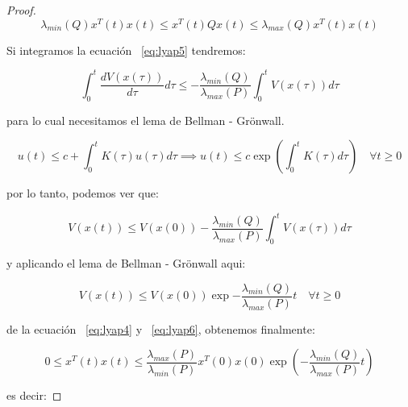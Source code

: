 \begin{proof}
            \begin{equation*}
                \lambda_{min}(Q) x^T(t) x(t) \le x^T(t) Q x(t) \le \lambda_{max}(Q) x^T(t) x(t)
            \end{equation*}

            Si integramos la ecuación ~\ref{eq:lyap5} tendremos:

            \begin{equation*}
                \int_{0}^{t}\frac{dV(x(\tau))}{d\tau} d\tau \le - \frac{\lambda_{min}(Q)}{\lambda_{max}(P)} \int_{0}^{t} V(x(\tau)) d\tau
            \end{equation*}

            para lo cual necesitamos el lema de Bellman - Grönwall.

            \begin{nota}
                \begin{equation*}
                    u(t) \le c + \int_0^t K(\tau) u(\tau) d\tau \implies u(t) \le c \exp{\left( \int_0^t K(\tau) d\tau \right)} \quad \forall t \ge 0
                \end{equation*}
            \end{nota}

            por lo tanto, podemos ver que:

            \begin{equation}
                V(x(t)) \le V(x(0)) - \frac{\lambda_{min}(Q)}{\lambda_{max}(P)} \int_0^t V(x(\tau)) d\tau
            \end{equation}

            y aplicando el lema de Bellman - Grönwall aqui:

            \begin{equation} \label{eq:lyap6}
                V(x(t)) \le V(x(0)) \exp{- \frac{\lambda_{min}(Q)}{\lambda_{max}(P)} t} \quad \forall t \ge 0
            \end{equation}

            de la ecuación ~\ref{eq:lyap4} y ~\ref{eq:lyap6}, obtenemos finalmente:

            \begin{equation*}
                0 \le x^T(t)x(t) \le \frac{\lambda_{max}(P)}{\lambda_{min}(P)} x^T(0)x(0) \exp{\left( - \frac{\lambda_{min}(Q)}{\lambda_{max}(P)} t \right)}
            \end{equation*}

            es decir:


\end{proof}

